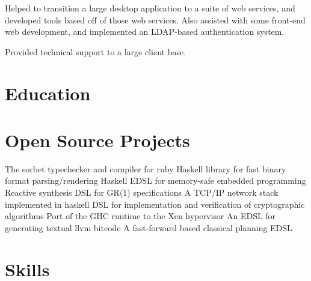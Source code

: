 \documentclass[letter,10pt]{moderncv}
\begin{document}
  {}{Helped to transition a large desktop application to a suite of web
  services, and developed tools based off of those web services. Also assisted
  with some front-end web development, and implemented an LDAP-based
  authentication system.}

  {}{Provided technical support to a large client base.}

\section{Education}


\section{Open Source Projects}
  {The sorbet typechecker and compiler for ruby}
  {Haskell library for fast binary format parsing/rendering}
  {Haskell EDSL for memory-safe embedded programming}
  {Reactive synthesis DSL for GR(1) specifications}
  {A TCP/IP network stack implemented in haskell}
  {DSL for implementation and verification of cryptographic algorithms}
  {Port of the GHC runtime to the Xen hypervisor}
  {An EDSL for generating textual llvm bitcode}
  {A fast-forward based classical planning EDSL}

\section{Skills}

\printbibliography[title=Publications]
\end{document}
